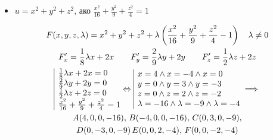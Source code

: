 \documentclass[a4paper,fleqn,12pt]{article}
\theoremstyle{definition}
\begin{document}
\begin{itemize}
\item $u = x^2 + y^2 + z^2$, ако $\frac{x^2}{16} + \frac{y^2}{9} + \frac{z^2}{4} = 1$

\begin{gather*}
F(x,y,z,\lambda) = x^2 + y^2 + z^2 + \lambda\left( \frac{x^2}{16} + \frac{y^2}{9} + \frac{z^2}{4} - 1 \right)   \quad \lambda \neq 0 \\
F'_x = \frac{1}{8}\lambda x + 2x \qquad F'_y = \frac{2}{9}\lambda y+ 2y \qquad F'_z = \frac{1}{2}\lambda z + 2z\\
\begin{array}{|l@{}}
\frac{1}{8}\lambda x + 2x= 0\\
\frac{2}{9}\lambda y+ 2y = 0 \\
\frac{1}{2}\lambda z + 2z = 0\\
\frac{x^2}{16} + \frac{y^2}{9} + \frac{z^2}{4} = 1
\end{array}\Leftrightarrow 
\begin{array}{|l@{}}
x =  4 \land x = -4 \land x = 0\\
y =  0 \land y = 3 \land y = -3\\
z = 0 \land z = 2 \land z = -2 \\
\lambda = -16 \land \lambda = -9 \land \lambda = -4
\end{array} \implies \\ 
A (4,0,0,-16), \, 
B(-4,0,0,-16), \, 
C(0,3,0,-9), \\
D(0,-3,0,-9) \, 
E(0,0,2,-4), \, 
F(0,0,-2,-4) 
\end{gather*}


\end{itemize}
\end{document}
